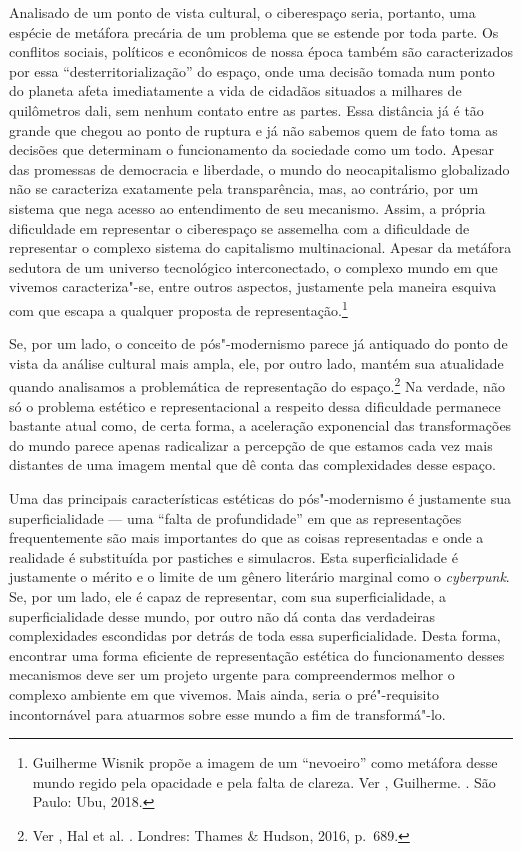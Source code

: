 Analisado de um ponto de vista cultural, o ciberespaço seria, portanto, uma
espécie de metáfora precária de um problema que se estende por toda
parte. Os conflitos sociais, políticos e econômicos de nossa época
também são caracterizados por essa ``desterritorialização'' do espaço,
onde uma decisão tomada num ponto do planeta afeta imediatamente a vida
de cidadãos situados a milhares de quilômetros dali, sem nenhum contato
entre as partes. Essa distância já é tão grande que chegou ao ponto de
ruptura e já não sabemos quem de fato toma as decisões que determinam o
funcionamento da sociedade como um todo. Apesar das promessas de
democracia e liberdade, o mundo do neocapitalismo globalizado não se
caracteriza exatamente pela transparência, mas, ao contrário, por um
sistema que nega acesso ao entendimento de seu mecanismo. Assim, a
própria dificuldade em representar o ciberespaço se assemelha com a
dificuldade de representar o complexo sistema do capitalismo
multinacional. Apesar da metáfora sedutora de um universo
tecnológico interconectado, o complexo mundo em que vivemos
caracteriza"-se, entre outros aspectos, justamente pela maneira esquiva
com que escapa a qualquer proposta de representação.\footnote{Guilherme
  Wisnik propõe a imagem de um ``nevoeiro'' como metáfora desse mundo
  regido pela opacidade e pela falta de clareza. Ver , Guilherme.
  {}. São
  Paulo: Ubu, 2018.}

Se, por um lado, o conceito de pós"-modernismo parece já antiquado do
ponto de vista da análise cultural mais ampla, ele, por outro lado,
mantém sua atualidade quando analisamos a problemática de representação
do espaço.\footnote{Ver , Hal et al. {}. Londres: Thames \& Hudson,
  2016, p.~689.} Na verdade, não só o problema estético e
representacional a respeito dessa dificuldade permanece bastante atual
como, de certa forma, a aceleração exponencial das transformações do
mundo parece apenas radicalizar a percepção de que estamos cada vez mais
distantes de uma imagem mental que dê conta das complexidades desse
espaço.

Uma das principais características estéticas do pós"-modernismo é
justamente sua superficialidade --- uma ``falta de profundidade'' em que as
representações frequentemente são mais importantes do que as coisas
representadas e onde a realidade é substituída por pastiches e
simulacros. Esta
superficialidade é justamente o mérito e o limite de um gênero literário
marginal como o \emph{cyberpunk}. Se, por um lado, ele é capaz de
representar, com sua superficialidade, a superficialidade desse mundo,
por outro não dá conta das verdadeiras complexidades
escondidas por detrás de toda essa superficialidade. Desta forma,
encontrar uma forma eficiente de representação estética do funcionamento
desses mecanismos deve ser um projeto urgente para compreendermos melhor
o complexo ambiente em que vivemos. Mais ainda, seria o pré"-requisito
incontornável para atuarmos sobre esse mundo a fim de transformá"-lo.

